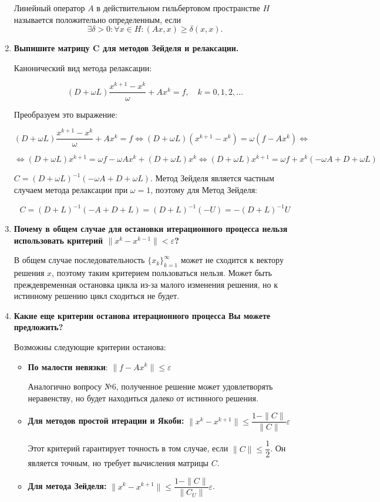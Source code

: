 \documentclass[12pt, a4paper]{article}
\begin{document}
\begin{enumerate}
		Линейный оператор $A$ в действительном гильбертовом пространстве $H$ называется положительно определенным, если
		\[
		\exists\delta>0: \forall x \in H: (Ax,x)\geqslant \delta(x,x).
		\]
		
		\item\textbf{Выпишите матрицу C для методов Зейделя и релаксации.}
		
		Канонический вид метода релаксации:
		
		\[
		(D + \omega L) \frac{x^{k+1} - x^k}{\omega} + Ax^k = f, \quad k = 0, 1, 2, \ldots
		\]
		
		Преобразуем это выражение:
		
		\[
		(D + \omega L) \frac{x^{k+1} - x^k}{\omega} + Ax^k = f 
		\Leftrightarrow (D + \omega L)(x^{k+1} - x^k) = \omega(f - Ax^k) 
		\Leftrightarrow
		\]
		
		\[
		\Leftrightarrow (D + \omega L)x^{k+1} = \omega f - \omega Ax^k + (D + \omega L)x^k 
		\Leftrightarrow (D + \omega L)x^{k+1} = \omega f + x^k(-\omega A + D + \omega L)
		\]
		
		\( C = (D + \omega L)^{-1}(-\omega A + D + \omega L) \). Метод Зейделя является частным случаем метода релаксации при \(\omega = 1\), поэтому для Метод Зейделя:
		
		\[
		C = (D + L)^{-1}(-A + D + L) = (D + L)^{-1}(-U) = -(D + L)^{-1}U
		\]
		\item\textbf{Почему в общем случае для остановки итерационного процесса нельзя использовать критерий $\|x^k-x^{k-1}\|<\varepsilon$?}
		
		В общем случае последовательность $\{x_k\}_{k=1}^\infty$ может не сходится к вектору решения $x$, поэтому таким критерием пользоваться нельзя. Может быть преждевременная остановка цикла из-за малого изменения решения, но к истинному решению цикл сходиться не будет.
		
		\item\textbf{Какие еще критерии останова итерационного процесса Вы можете предложить?}
		
		Возможны следующие критерии останова:
		
		\begin{itemize}
			\item\textbf{По малости невязки}: $\|f-Ax^k\|\leq\varepsilon$
			
			Аналогично вопросу №6, полученное решение может удовлетворять неравенству, но будет находиться далеко от истинного решения.
			\item\textbf{Для методов простой итерации и Якоби:} $\|x^k-x^{k+1}\|\leq\dfrac{1-\|C\|}{\|C\|}\varepsilon$
			
			Этот критерий гарантирует точность в том случае, если $\|C\|\leq\dfrac12$. Он является точным, но требует вычисления матрицы $C$.
			\item\textbf{Для метода Зейделя:} $\|x^k-x^{k+1}\|\leq\dfrac{1-\|C\|}{\|C_U\|}\varepsilon$.
		\end{itemize}
		
		
	\end{enumerate}
\end{document}
